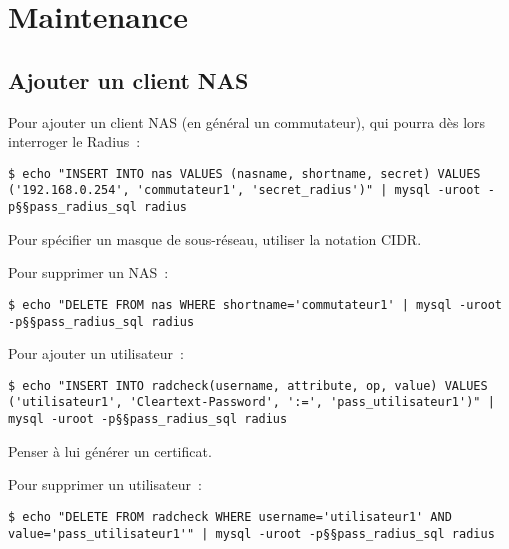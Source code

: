 \section{Maintenance}
\subsection{Ajouter un client NAS}

Pour ajouter un client NAS (en général un commutateur), qui pourra dès lors interroger le Radius~:

\begin{lstlisting}
$ echo "INSERT INTO nas VALUES (nasname, shortname, secret) VALUES ('192.168.0.254', 'commutateur1', 'secret_radius')" | mysql -uroot -p§§pass_radius_sql radius
\end{lstlisting}

Pour spécifier un masque de sous-réseau, utiliser la notation CIDR.

Pour supprimer un NAS~:

\begin{lstlisting}
$ echo "DELETE FROM nas WHERE shortname='commutateur1' | mysql -uroot -p§§pass_radius_sql radius
\end{lstlisting}

Pour ajouter un utilisateur~:

\begin{lstlisting}
$ echo "INSERT INTO radcheck(username, attribute, op, value) VALUES ('utilisateur1', 'Cleartext-Password', ':=', 'pass_utilisateur1')" | mysql -uroot -p§§pass_radius_sql radius
\end{lstlisting}

Penser à lui générer un certificat.

Pour supprimer un utilisateur~:

\begin{lstlisting}
$ echo "DELETE FROM radcheck WHERE username='utilisateur1' AND value='pass_utilisateur1'" | mysql -uroot -p§§pass_radius_sql radius
\end{lstlisting}
